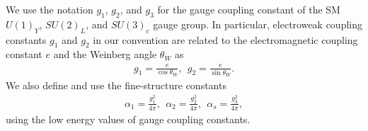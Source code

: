 \documentclass[12pt,twoside,book]{article}
\begin{document}
We use the notation $g_1$, $g_2$, and $g_3$ for the gauge coupling constant of the SM $U(1)_Y$, $SU(2)_L$, and $SU(3)_c$ gauge group.
In particular, electroweak coupling constants $g_1$ and $g_2$ in our convention are related to the electromagnetic coupling constant $e$ and the Weinberg angle $\theta_W$ as
\begin{align}
  g_1 = \frac{e}{\cos \theta_W},
  ~~
  g_2 = \frac{e}{\sin \theta_W}.
\end{align}
We also define and use the fine-structure constants
\begin{align}
  \alpha_1 = \frac{g_1^2}{4\pi},
  ~~
  \alpha_2 = \frac{g_2^2}{4\pi},
  ~~
  \alpha_s = \frac{g_3^2}{4\pi},
\end{align}
using the low energy values of gauge coupling constants.
\end{document}
